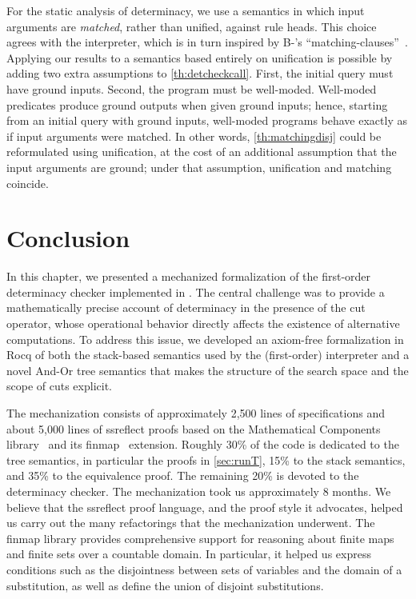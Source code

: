 For the static analysis of determinacy, we use a semantics in which
input arguments are \emph{matched}, rather than unified, against rule
heads. This choice agrees with the \elpi interpreter, which is in turn
inspired by B-\prolog's
``matching-clauses''~\cite{ait1991-wam,zhou2012}.
Applying our results to a semantics based entirely on unification is
possible by adding two extra assumptions to
\cref{th:detcheckcall}. First, the initial query must have ground inputs. Second, the
program must be well-moded. Well-moded predicates produce ground
outputs when given ground inputs; hence, starting from an initial query
with ground inputs, well-moded programs behave exactly as if input
arguments were matched. In other words,
\cref{th:matchingdisj} could be reformulated using unification, at the
cost of an additional assumption that the input arguments are ground;
under that assumption, unification and matching coincide.

\section{Conclusion}%

In this chapter, we presented a mechanized formalization of the first-order
determinacy checker implemented in \elpi. The central challenge was to provide a
mathematically precise account of determinacy in the presence of the cut
operator, whose operational behavior directly affects the existence of
alternative computations. To address this issue, we developed an axiom-free
formalization in Rocq of both the stack-based semantics used by the (first-order) \elpi
interpreter and a novel And-Or tree semantics that makes the structure of the
search space and the scope of cuts explicit.

The mechanization consists of approximately 2,500 lines of
specifications and about 5,000 lines of ssreflect proofs based on
the Mathematical Components library~\cite{assia2022}
and its finmap~\cite{finmap} extension.
Roughly 30\% of the code is dedicated to the tree semantics, in particular
the proofs in \cref{sec:runT}, 15\% to the stack semantics, and 35\% to the
equivalence proof. The remaining 20\% is devoted to the determinacy checker.
The mechanization took us approximately $8$ months.
We believe that the ssreflect proof language, and the proof style it
advocates, helped us carry out the many refactorings that the mechanization
underwent. The finmap library provides comprehensive support for reasoning
about finite maps and finite sets over a countable domain. In particular, it
helped us express conditions such as the disjointness between sets of
variables and the domain of a substitution, as well as define the union of
disjoint substitutions.

